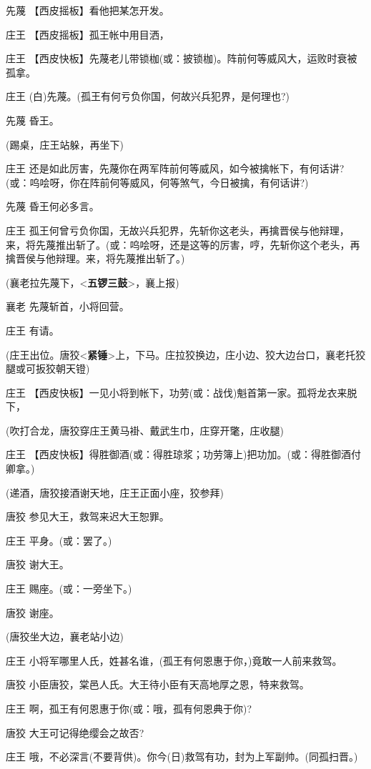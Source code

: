 先蔑 【西皮摇板】看他把某怎开发。

庄王 【西皮摇板】孤王帐中用目洒，

庄王
【西皮快板】先蔑老儿带锁枷(或：披锁枷)。阵前何等威风大，运败时衰被孤拿。

庄王 (白)先蔑。(孤王有何亏负你国，何故兴兵犯界，是何理也?)

先蔑 昏王。

(踢桌，庄王站躲，再坐下)

庄王
还是如此厉害，先蔑你在两军阵前何等威风，如今被擒帐下，有何话讲?(或：呜哙呀，你在阵前何等威风，何等煞气，今日被擒，有何话讲?)

先蔑 昏王何必多言。

庄王
孤王何曾亏负你国，无故兴兵犯界，先斩你这老头，再擒晋侯与他辩理，来，将先蔑推出斩了。(或：呜哙呀，还是这等的厉害，哼，先斩你这个老头，再擒晋侯与他辩理。来，将先蔑推出斩了。)

(襄老拉先蔑下，\textless{}\textbf{五锣三鼓}\textgreater{}，襄上报)

襄老 先蔑斩首，小将回营。

庄王 有请。

(庄王出位。唐狡\textless{}\textbf{紧锤}\textgreater{}上，下马。庄拉狡换边，庄小边、狡大边台口，襄老托狡腿或可扳狡朝天镫)

庄王
【西皮快板】一见小将到帐下，功劳(或：战伐)魁首第一家。孤将龙衣来脱下，

(吹打合龙，唐狡穿庄王黄马褂、戴武生巾，庄穿开氅，庄收腿)

庄王
【西皮快板】得胜御酒(或：得胜琼浆；功劳簿上)把功加。(或：得胜御酒付卿拿。)

(递酒，唐狡接酒谢天地，庄王正面小座，狡参拜)

唐狡 参见大王，救驾来迟大王恕罪。

庄王 平身。(或：罢了。)

唐狡 谢大王。

庄王 赐座。(或：一旁坐下。)

唐狡 谢座。

(唐狡坐大边，襄老站小边)

庄王 小将军哪里人氏，姓甚名谁，(孤王有何恩惠于你，)竟敢一人前来救驾。

唐狡 小臣唐狡，棠邑人氏。大王待小臣有天高地厚之恩，特来救驾。

庄王 啊，孤王有何恩惠于你(或：哦，孤有何恩典于你)?

唐狡 大王可记得绝缨会之故否?

庄王
哦，不必深言(不要背供)。你今(日)救驾有功，封为上军副帅。(同孤扫晋。)

